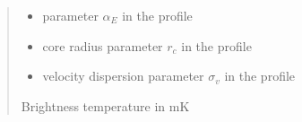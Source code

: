 \documentclass[letterpaper,10pt,english]{sphinxmanual}
\begin{document}
\begin{fulllineitems}
\begin{quote}
\begin{description}
\begin{itemize}
\item {} 
\sphinxAtStartPar
{} \textendash{} parameter \(\alpha_E\) in the {\hyperref[\detokenize{diffsph.profiles:diffsph.profiles.templates.enst}]{}} profile

\item {} 
\sphinxAtStartPar
{} \textendash{} core radius parameter \(r_c\) in the {\hyperref[\detokenize{diffsph.profiles:diffsph.profiles.templates.cnfw}]{}} profile

\item {} 
\sphinxAtStartPar
{} \textendash{} velocity dispersion parameter \(\sigma_v\) in the {\hyperref[\detokenize{diffsph.profiles:diffsph.profiles.templates.sis}]{}} profile

\end{itemize}

\sphinxAtStartPar
Brightness temperature in mK

\end{description}\end{quote}

\end{fulllineitems}

\end{document}
